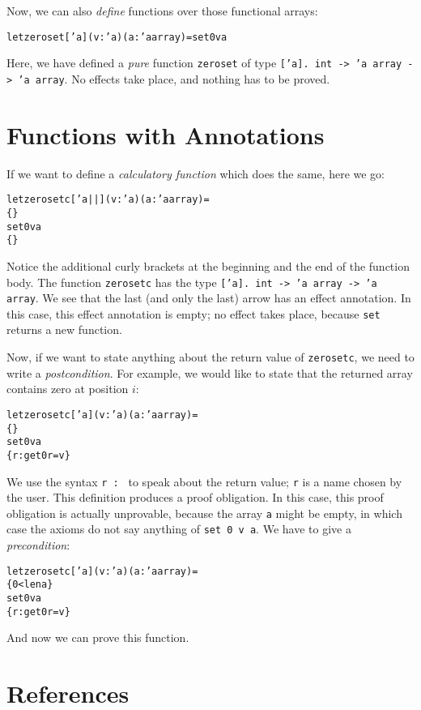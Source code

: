 \documentclass[a4paper]{scrreprt}
\begin{document}
Now, we can also {\em define} functions over those functional arrays:
\begin{alltt}
  let zeroset ['a] (v : 'a) (a : 'a array) = set 0 v a
\end{alltt}
Here, we have defined a {\em pure} function {\tt zeroset} of type {\tt ['a].
int -> 'a array -> 'a array}. No effects take place, and nothing has to be
proved.

\section{Functions with Annotations}

If we want to define a {\em calculatory function} which does the same, here we
go:
\begin{alltt}
  let zerosetc ['a||] (v : 'a) (a : 'a array) =
    \{ \}
    set 0 v a
    \{ \}
\end{alltt}
Notice the additional curly brackets at the beginning and the end of the
function body. The function {\tt zerosetc} has the type {\tt ['a]. int -> 'a
array ->{} 'a array}. We see that the last (and only the last) arrow has an
effect annotation. In this case, this effect annotation is empty; no effect
takes place, because {\tt set} returns a new function.

Now, if we want to state anything about the return value of {\tt zerosetc}, we
need to write a {\em postcondition}. For example, we would like to state that
the returned array contains zero at position $i$:
\begin{alltt}
  let zerosetc ['a] (v : 'a) (a : 'a array) =
    \{ \}
    set 0 v a
    \{ r : get 0 r = v \}
\end{alltt}
We use the syntax {\tt r : } to speak about the return value; {\tt r} is a
name chosen by the user. This definition produces a proof obligation. In this
case, this proof obligation is actually unprovable, because the array {\tt a}
might be empty, in which case the axioms do not say anything of {\tt set 0 v a}.
We have to give a {\em precondition}:
\begin{alltt}
  let zerosetc ['a] (v : 'a) (a : 'a array) =
    \{ 0 < len a \}
    set 0 v a
    \{ r : get 0 r = v \}
\end{alltt}
And now we can prove this function.

\section{References}
\end{document}
